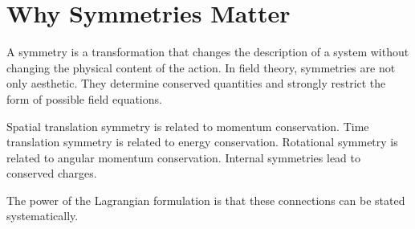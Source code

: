 \section{Why Symmetries Matter}

A symmetry is a transformation that changes the description of a system without
changing the physical content of the action. In field theory, symmetries are not
only aesthetic. They determine conserved quantities and strongly restrict the
form of possible field equations.

Spatial translation symmetry is related to momentum conservation. Time
translation symmetry is related to energy conservation. Rotational symmetry is
related to angular momentum conservation. Internal symmetries lead to conserved
charges.

The power of the Lagrangian formulation is that these connections can be stated
systematically.

